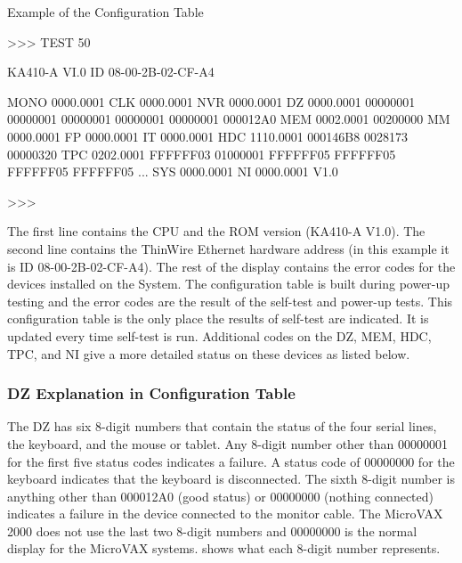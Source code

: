 \begin{ttfig}{Example of the Configuration Table}

>>> TEST 50

KA410-A VI.0
ID 08-00-2B-02-CF-A4

  MONO       0000.0001
  CLK        0000.0001
  NVR        0000.0001
  DZ         0000.0001
      00000001 00000001 00000001 00000001 00000001 000012A0
  MEM        0002.0001
      00200000
  MM         0000.0001
  FP         0000.0001
  IT         0000.0001
  HDC        1110.0001
     000146B8 0028173 00000320
  TPC        0202.0001
     FFFFFF03 01000001 FFFFFF05 FFFFFF05 FFFFFF05 FFFFFF05 ...
  SYS        0000.0001
  NI         0000.0001 V1.0

>>>

\end{ttfig}

The first line contains the CPU and the ROM version (KA410-A V1.0). The
second line contains the ThinWire Ethernet hardware address (in this example 
it is ID 08-00-2B-02-CF-A4). The rest of the display contains the error
codes for the devices installed on the System. The configuration table is
built during power-up testing and the error codes are the result of the self-test 
and power-up tests. This configuration table is the only place the results
of self-test are indicated. It is updated every time self-test is run. Additional
codes on the DZ, MEM, HDC, TPC, and NI give a more detailed status on
these devices as listed below.

\subsubsection{DZ Explanation in Configuration Table}

The DZ has six 8-digit numbers that contain the status of the four serial
lines, the keyboard, and the mouse or tablet. Any 8-digit number other
than 00000001 for the first five status codes indicates a failure. A status code
of 00000000 for the keyboard indicates that the keyboard is disconnected.
The sixth 8-digit number is anything other than 000012A0 (good status) or
00000000 (nothing connected) indicates a failure in the device connected to
the monitor cable. The MicroVAX 2000 does not use the last two 8-digit
numbers and 00000000 is the normal display for the MicroVAX systems.
 shows what each 8-digit number represents.

